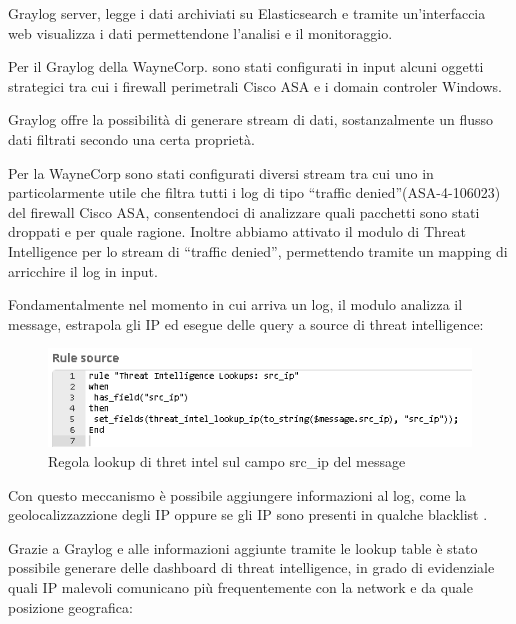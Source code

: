 Graylog server, legge i dati archiviati su Elasticsearch e tramite un'interfaccia web visualizza i dati permettendone l’analisi e il monitoraggio.\par
Per il Graylog della WayneCorp. sono stati configurati in input alcuni oggetti strategici tra cui i firewall perimetrali Cisco ASA e i domain controler Windows.\par
Graylog offre la possibilità di generare stream di dati, sostanzalmente un flusso dati filtrati secondo una certa proprietà.

\newpage

Per la WayneCorp sono stati configurati diversi stream tra cui uno in particolarmente utile che filtra tutti i log di  tipo “traffic denied”(ASA-4-106023) del firewall Cisco ASA, consentendoci di analizzare quali pacchetti sono stati droppati e per quale ragione. Inoltre abbiamo attivato il modulo di Threat Intelligence per lo stream di “traffic denied”, permettendo tramite un mapping di arricchire il log in input.\par

Fondamentalmente nel momento in cui arriva un log, il modulo analizza il message, estrapola gli IP ed esegue delle query a source di threat intelligence:

\begin{figure}[h]
            \begin{center}
                \includegraphics[width=0.90\columnwidth]{images/4_caso_d'uso_img/intelGL.png}
            \end{center}
            \caption{Regola lookup di thret intel sul campo src\_ip del message}
            \label{fig:Regola lookup di thret intel sul campo srcip del message}
    \end{figure}
    
Con questo meccanismo è possibile aggiungere informazioni al log, come la geolocalizzazzione degli IP oppure se gli IP sono presenti in qualche blacklist .\par
Grazie a Graylog e alle informazioni aggiunte tramite le lookup table è stato possibile generare delle dashboard di threat intelligence, in grado di evidenziale quali IP malevoli comunicano più frequentemente con la network e da quale posizione geografica:
    
